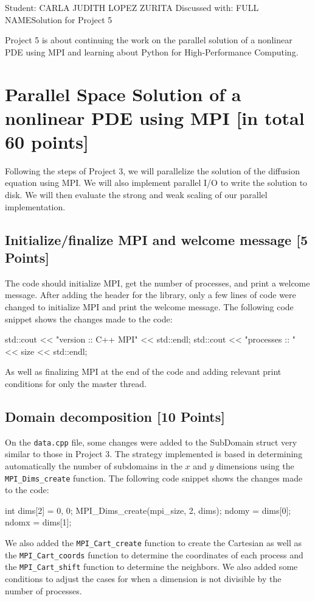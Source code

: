 \documentclass[unicode,11pt,a4paper,oneside,numbers=endperiod,openany]{scrartcl}
\begin{document}
\setassignment
{}

            {Student: CARLA JUDITH LOPEZ ZURITA}
            {Discussed with: FULL NAME}{Solution for Project 5}{}
\newline

\assignmentpolicy


Project 5 is about continuing the work on the parallel solution of a nonlinear
PDE using MPI and learning about Python for High-Performance Computing.

\section{Parallel Space Solution of a nonlinear PDE using MPI
         [in total 60 points]}
Following the steps of Project 3, we will parallelize the solution of the
diffusion equation using MPI. We will also implement parallel I/O to write
the solution to disk. We will then evaluate the strong and weak scaling of
our parallel implementation.
\subsection{Initialize/finalize MPI and welcome message [5 Points]}
The code should initialize MPI, get the number of processes, and print a welcome
message. After adding the header for the library, only a few lines of code were changed to initialize MPI and print the welcome message. The following code snippet shows the changes made to the code:
\begin{cppverbatim}
std::cout << "version   :: C++ MPI" << std::endl;
std::cout << "processes :: " << size << std::endl;
\end{cppverbatim}
As well as finalizing MPI at the end of the code and adding relevant print
conditions for only the master thread.
\subsection{Domain decomposition [10 Points]}

On the \texttt{data.cpp} file, some changes were added to the SubDomain struct
very similar to those in Project 3.  The
strategy implemented is based in determining automatically the number of
subdomains in the $x$ and $y$ dimensions using the \texttt{MPI\_Dims\_create}
function. The following code snippet shows the changes made to the code:
\begin{cppverbatim}
int dims[2] = {0, 0};
MPI_Dims_create(mpi_size, 2, dims);
ndomy = dims[0];
ndomx = dims[1];
\end{cppverbatim}
We also added the \texttt{MPI\_Cart\_create} function to create the Cartesian as
well as the \texttt{MPI\_Cart\_coords} function to determine the coordinates of
each process and the \texttt{MPI\_Cart\_shift} function to determine the neighbors.
We also added some conditions to adjust the
cases for when a dimension is not divisible by the number of processes.
\end{document}
